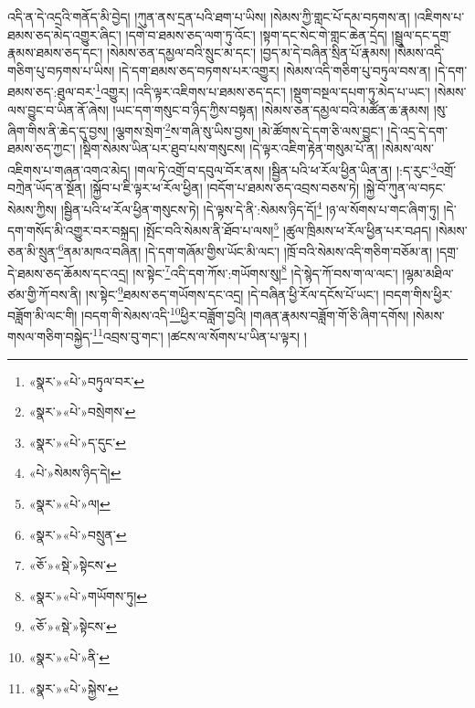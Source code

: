 འདི་ན་དེ་འདྲའི་གནོད་མི་བྱེད། །ཀུན་ནས་དྲན་པའི་ཐག་པ་ཡིས། །སེམས་ཀྱི་གླང་པོ་དམ་བཏགས་ན། །འཇིགས་པ་ཐམས་ཅད་མེད་འགྱུར་ཞིང་། །དགེ་བ་ཐམས་ཅད་ལག་ཏུ་འོང་། །སྟག་དང་སེང་གེ་གླང་ཆེན་དྲེད། །སྦྲུལ་དང་དགྲ་རྣམས་ཐམས་ཅད་དང་། །སེམས་ཅན་དམྱལ་བའི་སྲུང་མ་དང་། །བྱད་མ་དེ་བཞིན་སྲིན་པོ་རྣམས། །སེམས་འདི་གཅིག་པུ་བཏགས་པ་ཡིས། །དེ་དག་ཐམས་ཅད་བཏགས་པར་འགྱུར། །སེམས་འདི་གཅིག་པུ་བཏུལ་བས་ན། །དེ་དག་ཐམས་ཅད་:ཐུལ་བར་\footnote{«སྣར་»«པེ་»བཏུལ་བར་}འགྱུར། །འདི་ལྟར་འཇིགས་པ་ཐམས་ཅད་དང་། །སྡུག་བསྔལ་དཔག་ཏུ་མེད་པ་ཡང་། །སེམས་ལས་བྱུང་བ་ཡིན་ནོ་ཞེས། །ཡང་དག་གསུང་བ་ཉིད་ཀྱིས་བསྟན། །སེམས་ཅན་དམྱལ་བའི་མཚོན་ཆ་རྣམས། །སུ་ཞིག་གིས་ནི་ཆེད་དུ་བྱས། །ལྕགས་སྲེག་\footnote{«སྣར་»«པེ་»བསྲེགས་}ས་གཞི་སུ་ཡིས་བྱས། །མེ་ཚོགས་དེ་དག་ཅི་ལས་བྱུང་། །དེ་འདྲ་དེ་དག་ཐམས་ཅད་ཀྱང་། །སྡིག་སེམས་ཡིན་པར་ཐུབ་པས་གསུངས། །དེ་ལྟར་འཇིག་རྟེན་གསུམ་པོ་ན། །སེམས་ལས་འཇིགས་པ་གཞན་འགའ་མེད། །གལ་ཏེ་འགྲོ་བ་དབུལ་བོར་ནས། །སྦྱིན་པའི་ཕ་རོལ་ཕྱིན་ཡིན་ན། །:ད་རུང་\footnote{«སྣར་»«པེ་»ད་དུང་}འགྲོ་བཀྲེན་ཡོད་ན་སྔོན། །སྐྱོབ་པ་ཇི་ལྟར་ཕ་རོལ་ཕྱིན། །བདོག་པ་ཐམས་ཅད་འབྲས་བཅས་ཏེ། །སྐྱེ་བོ་ཀུན་ལ་བཏང་སེམས་ཀྱིས། །སྦྱིན་པའི་ཕ་རོལ་ཕྱིན་གསུངས་ཏེ། །དེ་ལྟས་དེ་ནི་:སེམས་ཉིད་དོ།\footnote{«པེ་»སེམས་ཉིད་དེ།} །ཉ་ལ་སོགས་པ་གང་ཞིག་ཏུ། །དེ་དག་གསོད་མི་འགྱུར་བར་བསྐྲད། །སྤོང་བའི་སེམས་ནི་ཐོབ་པ་ལས།\footnote{«སྣར་»«པེ་»ལ།} །ཚུལ་ཁྲིམས་ཕ་རོལ་ཕྱིན་པར་བཤད། །སེམས་ཅན་མི་སྲུན་\footnote{«སྣར་»«པེ་»བསྲུན་}ནམ་མཁའ་བཞིན། །དེ་དག་གཞོམ་གྱིས་ཡོང་མི་ལང་། །ཁྲོ་བའི་སེམས་འདི་གཅིག་བཅོམ་ན། །དགྲ་དེ་ཐམས་ཅད་ཆོམས་དང་འདྲ། །ས་སྟེང་\footnote{«ཅོ་»«སྡེ་»སྟེངས་}འདི་དག་ཀོས་:གཡོགས་སུ།\footnote{«སྣར་»«པེ་»གཡོགས་ཏུ།} །དེ་སྙེད་ཀོ་བས་ག་ལ་ལང་། །ལྷམ་མཐིལ་ཙམ་གྱི་ཀོ་བས་ནི། །ས་སྟེང་\footnote{«ཅོ་»«སྡེ་»སྟེངས་}ཐམས་ཅད་གཡོགས་དང་འདྲ། །དེ་བཞིན་ཕྱི་རོལ་དངོས་པོ་ཡང་། །བདག་གིས་ཕྱིར་བཟློག་མི་ལང་གི། །བདག་གི་སེམས་འདི་\footnote{«སྣར་»«པེ་»ནི་}ཕྱིར་བཟློག་བྱའི། །གཞན་རྣམས་བཟློག་གོ་ཅི་ཞིག་དགོས། །སེམས་གསལ་གཅིག་བསྐྱེད་\footnote{«སྣར་»«པེ་»སྐྱེས་}འབྲས་བུ་གང་། །ཚངས་ལ་སོགས་པ་ཡིན་པ་ལྟར། །
